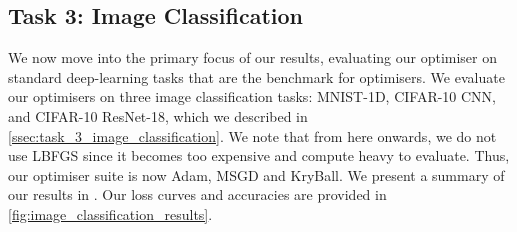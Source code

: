 \subsection{Task 3: Image Classification}
\label{ssec:results_image_classification}

We now move into the primary focus of our results, evaluating our optimiser on standard deep-learning tasks that are the benchmark for optimisers. We evaluate our optimisers on three image classification tasks: MNIST-1D, CIFAR-10 CNN, and CIFAR-10 ResNet-18, which we described in \cref{ssec:task_3_image_classification}. We note that from here onwards, we do not use LBFGS since it becomes too expensive and compute heavy to evaluate. Thus, our optimiser suite is now Adam, MSGD and KryBall. We present a summary of our results in . Our loss curves and accuracies are provided in \cref{fig:image_classification_results}. 



